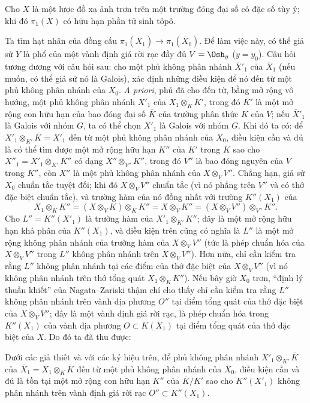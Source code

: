  Cho $X$ là một lược đồ xạ ảnh trơn trên một trường đóng đại
số có đặc số tùy ý; khi đó $\pi_1(X)$ có hữu hạn phần tử sinh tôpô.

Ta tìm hạt nhân của đồng cấu
$\pi_1(\overline X_1)\longrightarrow\pi_1(\overline X_0)$. Để làm việc này,
có thể giả sử $Y$ là phổ của một vành định giá rời rạc đầy đủ
$V=\Osh_y$ ($y=y_0$). Câu hỏi tương đương với câu hỏi sau: cho một phủ không
phân nhánh $\overline X'_1$ của $\overline X_1$ (nếu muốn, có thể giả sử nó là
Galois), xác định những điều kiện để nó đến từ một phủ không phân nhánh của
$X_0$. \textit{A priori}, phủ đã cho đến từ, bằng mở rộng vô hướng, một phủ
không phân nhánh $X'_1$ của $X_1\otimes_K K'$, trong đó $K'$ là một mở rộng
con hữu hạn của bao đóng đại số $\overline K$ của trường phân thức $K$ của
$V$; nếu $\overline X'_1$ là Galois với nhóm $G$, ta có thể chọn $X'_1$ là
Galois với nhóm $G$. Khi đó ta có: để
$X'_1\otimes_{K'}\overline K=\overline X'_1$ đến từ một phủ không phân nhánh
của $X_0$, điều kiện cần và đủ là có thể tìm được một mở rộng hữu hạn $K''$
của $K'$ trong $\overline K$ sao cho
$X''_1=X'_1\otimes_{K'}K''$ có dạng $X''\otimes_{V''}K''$, trong đó $V''$ là
bao đóng nguyên của $V$ trong $K''$, còn $X''$ là một phủ không phân nhánh của
$X\otimes_VV''$. Chẳng hạn, giả sử $X_0$ chuẩn tắc tuyệt đối; khi đó
$X\otimes_VV''$ chuẩn tắc (vì nó phẳng trên $V''$ và có thớ đặc biệt chuẩn
tắc), và trường hàm của nó đồng nhất với trường $K''(X_1)$ của
\[
  X_1\otimes_KK''
  =(X\otimes_VK)\otimes_KK''
  =X\otimes_VK''
  =(X\otimes_VV'')\otimes_{V''}K''.
\]
Cho $L''=K''(X'_1)$ là trường hàm của
$X'_1\otimes_{K'}K''$; đây là một mở rộng hữu hạn khả phân của $K''(X_1)$, và
điều kiện trên cũng có nghĩa là $L''$ là một mở rộng không phân nhánh của
trường hàm của $X\otimes_VV''$ (tức là phép chuẩn hóa của
$X\otimes_VV''$ trong $L''$ không phân nhánh trên $X\otimes_VV''$). Hơn nữa,
chỉ cần kiểm tra rằng $L''$ không phân nhánh tại các điểm của thớ đặc biệt của
$X\otimes_VV''$ (vì nó không phân nhánh trên thớ tổng quát
$X_1\otimes_KK''$). Nếu bây giờ $X_0$ trơn, “định lý thuần khiết” của
Nagata--Zariski thậm chí cho thấy chỉ cần kiểm tra rằng $L''$ không phân nhánh
trên vành địa phương $O''$ tại điểm tổng quát của thớ đặc biệt của
$X\otimes_VV''$; đây là một vành định giá rời rạc, là phép chuẩn hóa trong
$K''(X_1)$ của vành địa phương $O\subset K(X_1)$ tại điểm tổng quát của thớ
đặc biệt của $X$. Do đó ta đã thu được:

 Dưới các giả thiết và với các ký hiệu trên, để phủ không
phân nhánh $X'_1\otimes_{K'}\overline K$ của
$\overline X_1=X_1\otimes_K\overline K$ đến từ một phủ không phân nhánh của
$\overline X_0$, điều kiện cần và đủ là tồn tại một mở rộng con hữu hạn $K''$
của $\overline K/K'$ sao cho $K''(X'_1)$ không phân nhánh trên vành định giá
rời rạc $O''\subset K''(X_1)$.

